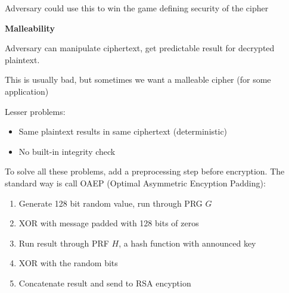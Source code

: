 Adversary could use this to win the game defining security of the cipher

\begin{definition}
{\bf Malleability}

Adversary can manipulate ciphertext, get predictable result for decrypted
plaintext.

This is usually bad, but sometimes we want a malleable cipher (for some
application)
\end{definition}

Lesser problems:
\begin{itemize}
    \item Same plaintext results in same ciphertext (deterministic)
    \item No built-in integrity check
\end{itemize}

To solve all these problems, add a preprocessing step before encryption. The
standard way is call OAEP (Optimal Asymmetric Encyption Padding):
\begin{enumerate}
    \item Generate 128 bit random value, run through PRG $G$
    \item XOR with message padded with 128 bits of zeros
    \item Run result through PRF $H$, a hash function with announced key
    \item XOR with the random bits
    \item Concatenate result and send to RSA encyption
\end{enumerate}

\makebox[2cm]{}\makebox[.5cm]{}\\
\makebox[.5cm]{}\\
\makebox[6cm]{\makebox[3.5cm]{$\downarrow$}\makebox[.5cm]{}\makebox[2cm]{$\downarrow$}}\\
\makebox[1.5cm]{}\makebox[.5cm]{$\oplus$}\makebox[.4cm]{$\downarrow$}\\
\makebox[6cm]{\makebox[3.5cm]{$\downarrow$}\makebox[.5cm]{}\makebox[2cm]{$\downarrow$}}\\
\makebox[1.5cm]{}\makebox[.5cm]{$\downarrow$}\makebox[.4cm]{$\oplus$}\\
\makebox[1.5cm]{}\makebox[.5cm]{$\downarrow$}\makebox[2.8cm]{\rule[-0.1cm]{2.8cm}{0.01cm}}\makebox[.4cm]{$\downarrow$}\\
\makebox[1.5cm]{}\makebox[.5cm]{}\makebox[2.8cm]{$\downarrow$}\makebox[.4cm]{}\\
\makebox[1.5cm]{}\makebox[.5cm]{}\makebox[.4cm]{}\\

